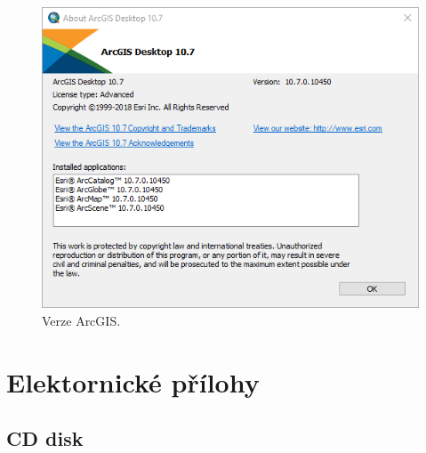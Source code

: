 \begin{figure}[h]
  \centering
  \includegraphics[width=12cm]{./pictures/prilohy/arcgis_about.png}
  \caption{Verze ArcGIS.}
  \label{fig:arcgis_about}
\end{figure}






\chapter{Elektornické přílohy}
\label{user-guide}

\section{CD disk}

\label{app:cd}
    
